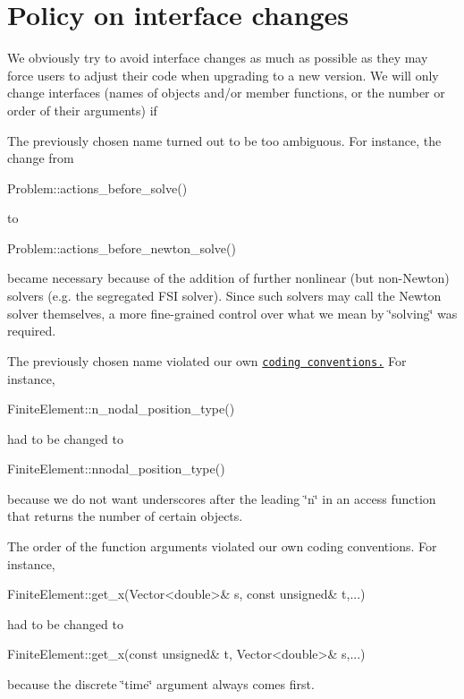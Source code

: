 \hypertarget{index_interface_changes}{}\section{Policy on interface changes}\label{index_interface_changes}
We obviously try to avoid interface changes as much as possible as they may force users to adjust their code when upgrading to a new version. We will only change interfaces (names of objects and/or member functions, or the number or order of their arguments) if
\begin{DoxyEnumerate}
\item The previously chosen name turned out to be too ambiguous. For instance, the change from 
\begin{DoxyCode}
Problem::actions\_before\_solve() 
\end{DoxyCode}
 to 
\begin{DoxyCode}
Problem::actions\_before\_newton\_solve()
\end{DoxyCode}
 became necessary because of the addition of further nonlinear (but non-\/\+Newton) solvers (e.\+g. the segregated F\+SI solver). Since such solvers may call the Newton solver themselves, a more fine-\/grained control over what we mean by \char`\"{}solving\char`\"{} was required. ~\newline
~\newline

\item The previously chosen name violated our own \href{../../coding_conventions/html/index.html}{\tt coding conventions.} For instance, 
\begin{DoxyCode}
FiniteElement::n\_nodal\_position\_type()
\end{DoxyCode}
 had to be changed to 
\begin{DoxyCode}
FiniteElement::nnodal\_position\_type()
\end{DoxyCode}
 because we do not want underscores after the leading \char`\"{}n\char`\"{} in an access function that returns the number of certain objects. ~\newline
~\newline

\item The order of the function arguments violated our own coding conventions. For instance, 
\begin{DoxyCode}
FiniteElement::get\_x(Vector<double>& s, \textcolor{keyword}{const} \textcolor{keywordtype}{unsigned}& t,...) 
\end{DoxyCode}
 had to be changed to 
\begin{DoxyCode}
FiniteElement::get\_x(\textcolor{keyword}{const} \textcolor{keywordtype}{unsigned}& t, Vector<double>& s,...) 
\end{DoxyCode}
 because the discrete \char`\"{}time\char`\"{} argument always comes first. ~\newline
~\newline


\end{DoxyEnumerate}
